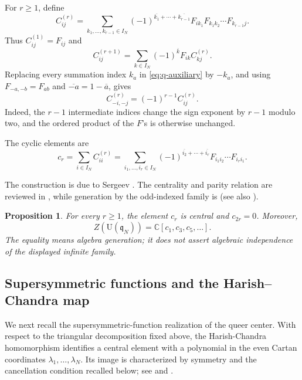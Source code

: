 \documentclass[11pt]{amsart}
\numberwithin{equation}{section}
\newtheorem{proposition}[theorem]{Proposition}
\theoremstyle{definition}
\theoremstyle{remark}
\newcommand{\C}{\mathbb C}
\newcommand{\q}{\mathfrak q}
\newcommand{\U}{\mathrm U}
\newcommand{\bars}[1]{\overline{#1}}
\begin{document}
For \(r\geq1\), define
\begin{equation}
 C_{ij}^{(r)}=
 \sum_{k_1,\ldots,k_{r-1}\in I_N}
 (-1)^{\bars{k_1}+\cdots+\bars{k_{r-1}}}
 F_{ik_1}F_{k_1k_2}\cdots F_{k_{r-1}j}.
 \label{eq:q-auxiliary}
\end{equation}
Thus \(C_{ij}^{(1)}=F_{ij}\) and
\begin{equation}
 C_{ij}^{(r+1)}
 =\sum_{k\in I_N}(-1)^{\bars k}F_{ik}C_{kj}^{(r)}.
 \label{eq:q-auxiliary-recursion}
\end{equation}
Replacing every summation index \(k_a\) in
\eqref{eq:q-auxiliary} by \(-k_a\), and using
\(F_{-a,-b}=F_{ab}\) and \(\bars{-a}=1-\bars a\), gives
\begin{equation}
 C_{-i,-j}^{(r)}=(-1)^{r-1}C_{ij}^{(r)}.
 \label{eq:q-auxiliary-reflection}
\end{equation}
Indeed, the \(r-1\) intermediate indices change the sign exponent by
\(r-1\) modulo two, and the ordered product of the \(F\)'s is otherwise
unchanged.

The cyclic elements are
\begin{equation}
 c_r=\sum_{i\in I_N}C_{ii}^{(r)}
 =\sum_{i_1,\ldots,i_r\in I_N}
 (-1)^{\bars{i_2}+\cdots+\bars{i_r}}
 F_{i_1i_2}\cdots F_{i_ri_1}.
 \label{eq:q-cyclic}
\end{equation}

The construction is due to Sergeev \cite{Sergeev1983}.  The centrality
and parity relation are reviewed in \cite[Section~1.2]{GN2019}, while
generation by the odd-indexed family is
\cite[Proposition~1.1]{NazarovSergeev2006} (see also \cite[Theorem~5.3]{DP2025}).

\begin{proposition}
\label{prop:cyclic-center}
For every \(r\geq1\), the element \(c_r\) is central and
\(c_{2r}=0\).  Moreover,
\begin{equation}
 Z(\U(\q_N))=\C[c_1,c_3,c_5,\ldots].
 \label{eq:q-center-cyclic}
\end{equation}
The equality means algebra generation; it does not assert algebraic
independence of the displayed infinite family.
\end{proposition}

\subsection{Supersymmetric functions and the Harish--Chandra map}
We next recall the supersymmetric-function realization of the queer
center.  With respect to the triangular decomposition fixed above, the
Harish-Chandra homomorphism identifies a central element with a
polynomial in the even Cartan coordinates
\(\lambda_1,\ldots,\lambda_N\).  Its image is characterized by
symmetry and the cancellation condition recalled below; see \cite[Definitions~2.1--2.2]{Ivanov2005} and
\cite[Chapter~III, Section~8]{Macdonald1995}.
\end{document}
